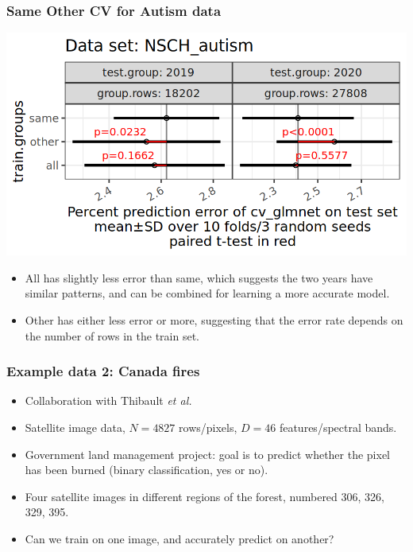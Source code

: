 \documentclass{beamer}
\begin{document}
\begin{frame}
  \frametitle{Same Other CV for Autism data}
  \includegraphics[width=\textwidth]{NSCH_autism_error_glmnet_sizes_mean_SD_pvalue.png}
  
  \vskip -0.4cm
  
  \begin{itemize}
  \item All has slightly less error than same, which suggests the
    two years have similar patterns, and can be combined for learning
    a more accurate model.
  \item Other has either less error or more, suggesting that the error
    rate depends on the number of rows in the train set.
  \end{itemize}
\end{frame}

\begin{frame}
  \frametitle{Example data 2: Canada fires}
  \begin{itemize}
  \item Collaboration with Thibault \emph{et al.}
  \item Satellite image data, $N=4827$ rows/pixels, $D=46$
    features/spectral bands.
  \item Government land management project: goal is to predict whether
    the pixel has been burned (binary classification, yes or no).
  \item Four satellite images in different regions of the forest,
    numbered 306, 326, 329, 395.
  \item Can we train on one image, and accurately predict on another?
  \end{itemize}
\end{frame}
\end{document}
